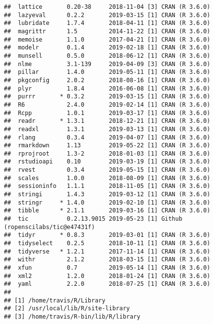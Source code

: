\documentclass[]{book}
\begin{document}
\begin{verbatim}
##  lattice       0.20-38     2018-11-04 [3] CRAN (R 3.6.0)                   
##  lazyeval      0.2.2       2019-03-15 [1] CRAN (R 3.6.0)                   
##  lubridate     1.7.4       2018-04-11 [1] CRAN (R 3.6.0)                   
##  magrittr      1.5         2014-11-22 [1] CRAN (R 3.6.0)                   
##  memoise       1.1.0       2017-04-21 [1] CRAN (R 3.6.0)                   
##  modelr        0.1.4       2019-02-18 [1] CRAN (R 3.6.0)                   
##  munsell       0.5.0       2018-06-12 [1] CRAN (R 3.6.0)                   
##  nlme          3.1-139     2019-04-09 [3] CRAN (R 3.6.0)                   
##  pillar        1.4.0       2019-05-11 [1] CRAN (R 3.6.0)                   
##  pkgconfig     2.0.2       2018-08-16 [1] CRAN (R 3.6.0)                   
##  plyr          1.8.4       2016-06-08 [1] CRAN (R 3.6.0)                   
##  purrr       * 0.3.2       2019-03-15 [1] CRAN (R 3.6.0)                   
##  R6            2.4.0       2019-02-14 [1] CRAN (R 3.6.0)                   
##  Rcpp          1.0.1       2019-03-17 [1] CRAN (R 3.6.0)                   
##  readr       * 1.3.1       2018-12-21 [1] CRAN (R 3.6.0)                   
##  readxl        1.3.1       2019-03-13 [1] CRAN (R 3.6.0)                   
##  rlang         0.3.4       2019-04-07 [1] CRAN (R 3.6.0)                   
##  rmarkdown     1.13        2019-05-22 [1] CRAN (R 3.6.0)                   
##  rprojroot     1.3-2       2018-01-03 [1] CRAN (R 3.6.0)                   
##  rstudioapi    0.10        2019-03-19 [1] CRAN (R 3.6.0)                   
##  rvest         0.3.4       2019-05-15 [1] CRAN (R 3.6.0)                   
##  scales        1.0.0       2018-08-09 [1] CRAN (R 3.6.0)                   
##  sessioninfo   1.1.1       2018-11-05 [1] CRAN (R 3.6.0)                   
##  stringi       1.4.3       2019-03-12 [1] CRAN (R 3.6.0)                   
##  stringr     * 1.4.0       2019-02-10 [1] CRAN (R 3.6.0)                   
##  tibble      * 2.1.1       2019-03-16 [1] CRAN (R 3.6.0)                   
##  tic           0.2.13.9015 2019-05-23 [1] Github (ropenscilabs/tic@e47431f)
##  tidyr       * 0.8.3       2019-03-01 [1] CRAN (R 3.6.0)                   
##  tidyselect    0.2.5       2018-10-11 [1] CRAN (R 3.6.0)                   
##  tidyverse   * 1.2.1       2017-11-14 [1] CRAN (R 3.6.0)                   
##  withr         2.1.2       2018-03-15 [1] CRAN (R 3.6.0)                   
##  xfun          0.7         2019-05-14 [1] CRAN (R 3.6.0)                   
##  xml2          1.2.0       2018-01-24 [1] CRAN (R 3.6.0)                   
##  yaml          2.2.0       2018-07-25 [1] CRAN (R 3.6.0)                   
## 
## [1] /home/travis/R/Library
## [2] /usr/local/lib/R/site-library
## [3] /home/travis/R-bin/lib/R/library
\end{verbatim}
\end{document}
